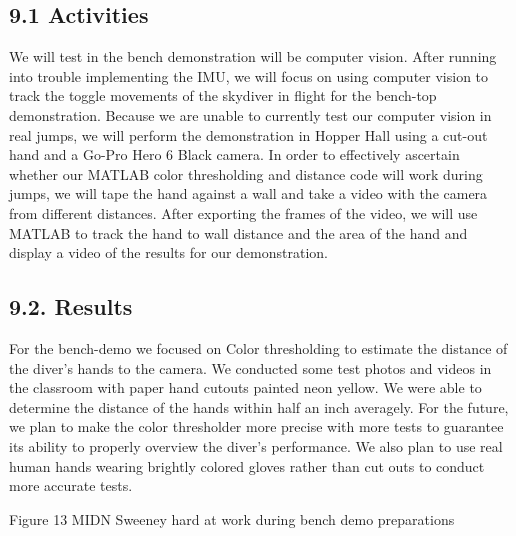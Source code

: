 \documentclass[10pt]{article}
\begin{document}
\subsection{9.1 Activities}

We will test in the bench demonstration will be computer vision. After running into trouble implementing the IMU, we will focus on using computer vision to track the toggle movements of the skydiver in flight for the bench-top demonstration. Because we are unable to currently test our computer vision in real jumps, we will perform the demonstration in Hopper Hall using a cut-out hand and a Go-Pro Hero 6 Black camera. In order to effectively ascertain whether our MATLAB color thresholding and distance code will work during jumps, we will tape the hand against a wall and take a video with the camera from different distances. After exporting the frames of the video, we will use MATLAB to track the hand to wall distance and the area of the hand and display a video of the results for our demonstration.



\subsection{9.2. Results}

For the bench-demo we focused on Color thresholding to estimate the distance of the diver’s hands to the camera. We conducted some test photos and videos in the classroom with paper hand cutouts painted neon yellow. We were able to determine the distance of the hands within half an inch averagely. For the future, we plan to make the color thresholder more precise with more tests to guarantee its ability to properly overview the diver’s performance. We also plan to use real human hands wearing brightly colored gloves rather than cut outs to conduct more accurate tests.



Figure 13 MIDN Sweeney hard at work during bench demo preparations











\end{document}
